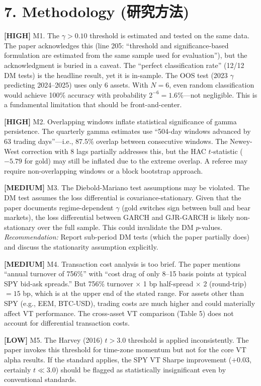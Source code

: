 \documentclass[12pt,a4paper]{article}
\newcommand{\high}[1]{\textcolor{errorred}{\textbf{[HIGH]} #1}}
\newcommand{\med}[1]{\textcolor{warncolor}{\textbf{[MEDIUM]} #1}}
\newcommand{\low}[1]{\textcolor{okgreen}{\textbf{[LOW]} #1}}
\begin{document}
\section*{7. Methodology (研究方法)}

\high{M1. The $\gamma > 0.10$ threshold is estimated and tested on the same data.} The paper acknowledges this (line 205: ``threshold and significance-based formulation are estimated from the same sample used for evaluation''), but the acknowledgment is buried in a caveat. The ``perfect classification rate'' (12/12 DM tests) is the headline result, yet it is in-sample. The OOS test (2023 $\gamma$ predicting 2024--2025) uses only 6 assets. With $N = 6$, even random classification would achieve 100\% accuracy with probability $2^{-6} = 1.6\%$---not negligible. This is a fundamental limitation that should be front-and-center.

\high{M2. Overlapping windows inflate statistical significance of gamma persistence.} The quarterly gamma estimates use ``504-day windows advanced by 63 trading days''---i.e., 87.5\% overlap between consecutive windows. The Newey-West correction with 8 lags partially addresses this, but the HAC $t$-statistic ($-5.79$ for gold) may still be inflated due to the extreme overlap. A referee may require non-overlapping windows or a block bootstrap approach.

\med{M3. The Diebold-Mariano test assumptions may be violated.} The DM test assumes the loss differential is covariance-stationary. Given that the paper documents regime-dependent $\gamma$ (gold switches sign between bull and bear markets), the loss differential between GARCH and GJR-GARCH is likely non-stationary over the full sample. This could invalidate the DM $p$-values. \emph{Recommendation:} Report sub-period DM tests (which the paper partially does) and discuss the stationarity assumption explicitly.

\med{M4. Transaction cost analysis is too brief.} The paper mentions ``annual turnover of 756\%'' with ``cost drag of only 8--15 basis points at typical SPY bid-ask spreads.'' But 756\% turnover $\times$ 1 bp half-spread $\times$ 2 (round-trip) $= 15$ bp, which is at the upper end of the stated range. For assets other than SPY (e.g., EEM, BTC-USD), trading costs are much higher and could materially affect VT performance. The cross-asset VT comparison (Table 5) does not account for differential transaction costs.

\low{M5. The Harvey (2016) $t > 3.0$ threshold is applied inconsistently.} The paper invokes this threshold for time-zone momentum but not for the core VT alpha results. If the standard applies, the SPY VT Sharpe improvement ($+0.03$, certainly $t \ll 3.0$) should be flagged as statistically insignificant even by conventional standards.
\end{document}
